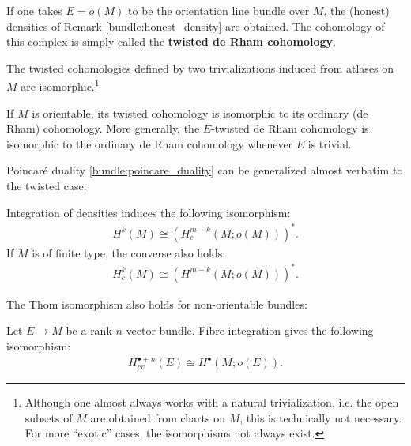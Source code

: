     If one takes $E=o(M)$ to be the orientation line bundle over $M$, the (honest) densities of Remark \ref{bundle:honest_density} are obtained. The cohomology of this complex is simply called the \textbf{twisted de Rham cohomology}.
    \begin{property}[Isomorphism]
        The twisted cohomologies defined by two trivializations induced from atlases on $M$ are isomorphic.\footnote{Although one almost always works with a natural trivialization, i.e. the open subsets of $M$ are obtained from charts on $M$, this is technically not necessary. For more ``exotic'' cases, the isomorphisms not always exist.}
    \end{property}
    \begin{property}
        If $M$ is orientable, its twisted cohomology is isomorphic to its ordinary (de Rham) cohomology. More generally, the $E$-twisted de Rham cohomology is isomorphic to the ordinary de Rham cohomology whenever $E$ is trivial.
    \end{property}

    Poincar\'e duality \ref{bundle:poincare_duality} can be generalized almost verbatim to the twisted case:
    \begin{theorem}
        Integration of densities induces the following isomorphism:
        \begin{gather}
            H^k(M)\cong\left(H^{m-k}_c(M;o(M))\right)^*.
        \end{gather}
        If $M$ is of finite type, the converse also holds:
        \begin{gather}
            H^k_c(M)\cong\left(H^{m-k}(M;o(M))\right)^*.
        \end{gather}
    \end{theorem}
    The Thom isomorphism also holds for non-orientable bundles:
    \begin{theorem}
        Let $E\rightarrow M$ be a rank-$n$ vector bundle. Fibre integration gives the following isomorphism:
        \begin{gather}
            H^{\bullet+n}_{cv}(E)\cong H^\bullet(M;o(E)).
        \end{gather}
    \end{theorem}